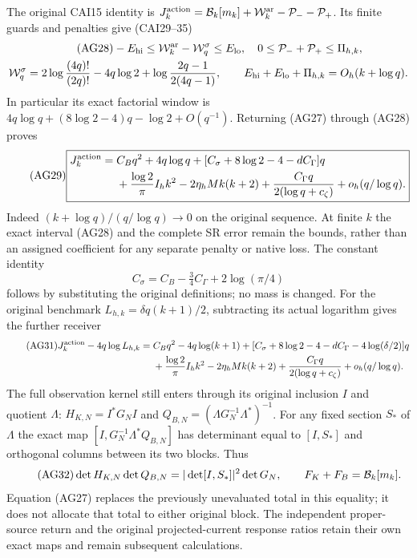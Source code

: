 The original CAI15 identity is
$J_k^{\rm action}=\mathcal B_k[m_k]+\mathcal W_k^{\rm ar}-\mathcal P_--\mathcal P_+$.
Its finite guards and penalties give (CAI29--35)
\begin{gather}\tag{AG28}
 -E_{\rm hi}\le\mathcal W_k^{\rm ar}-\mathcal W_q^\sigma\le E_{\rm lo},
 \quad0\le\mathcal P_-+\mathcal P_+\le\Pi_{h,k},\\
 \mathcal W_q^\sigma=2\log\frac{(4q)!}{(2q)!}-4q\log2
       +\log\frac{2q-1}{2(4q-1)},\qquad
 E_{\rm hi}+E_{\rm lo}+\Pi_{h,k}=O_h(k+\log q).\notag
\end{gather}
In particular its exact factorial window is
$4q\log q+(8\log2-4)q-\log2+O(q^{-1})$.
Returning (AG27) through (AG28) proves
\begin{equation}\tag{AG29}
 \boxed{\begin{aligned}J_k^{\rm action}={}&C_Bq^2+4q\log q
  +[C_\sigma+8\log2-4-dC_\Gamma]q\\
 &+\frac{\log2}{\pi}I_hk^2-2\eta_hMk(k+2)
  +\frac{C_\Gamma q}{2(\log q+c_\zeta)}+o_h(q/\log q).
 \end{aligned}}
\end{equation}
Indeed $(k+\log q)/(q/\log q)\to0$ on the original sequence. At finite $k$
the exact interval (AG28) and the complete SR error remain the bounds,
rather than an assigned coefficient for any separate penalty or native loss.
The constant identity
\begin{equation}\tag{AG30}
 C_\sigma=C_B-\tfrac34 C_\Gamma+2\log(\pi/4)
\end{equation}
follows by substituting the original definitions; no mass is changed.
For the original benchmark $L_{h,k}=\delta q(k+1)/2$, subtracting its
actual logarithm gives the further receiver
\begin{align}\tag{AG31}
 J_k^{\rm action}-4q\log L_{h,k}
 ={}&C_Bq^2-4q\log(k+1)
 +[C_\sigma+8\log2-4-dC_\Gamma-4\log(\delta/2)]q\\
 &+\frac{\log2}{\pi}I_hk^2-2\eta_hMk(k+2)
 +\frac{C_\Gamma q}{2(\log q+c_\zeta)}+o_h(q/\log q).\notag
\end{align}
The full observation kernel still enters through its original inclusion
$I$ and quotient $\Lambda$: $H_{K,N}=I^*G_NI$ and
$Q_{B,N}=(\Lambda G_N^{-1}\Lambda^*)^{-1}$.
For any fixed section $S_*$ of $\Lambda$ the exact map
$[I,G_N^{-1}\Lambda^*Q_{B,N}]$ has determinant equal to $[I,S_*]$ and
orthogonal columns between its two blocks. Thus
\begin{equation}\tag{AG32}
 \det H_{K,N}\det Q_{B,N}=|\det[I,S_*]|^2\det G_N,
 \qquad F_K+F_B=\mathcal B_k[m_k].
\end{equation}
Equation (AG27) replaces the previously unevaluated total in this equality;
it does not allocate that total to either original block. The independent
proper-source return and the original projected-current response ratios
retain their own exact maps and remain subsequent calculations.



